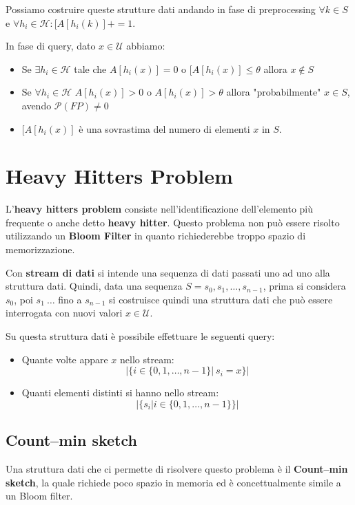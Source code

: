 Possiamo costruire queste strutture dati andando in fase di preprocessing $\forall k \in S$ e $\forall h_i \in \mathcal{H}: [A[h_i(k)] += 1$.

In fase di query, dato $x \in \mathcal{U}$ abbiamo:
\begin{itemize}
    \item Se $\exists h_i \in \mathcal{H}$ tale che $A[h_i(x)] = 0$ o $[A[h_i(x)] \leq \theta$ allora $x \notin S$
    \item Se $\forall h_i \in \mathcal{H}$ $A[h_i(x)] > 0$ o $A[h_i(x)] > \theta$ allora "probabilmente" $x \in S$, avendo $\mathcal{P}(FP) \neq 0$
    \item $[A[h_i(x)]$ è una sovrastima del numero di elementi $x$ in $S$.
\end{itemize}
\section{Heavy Hitters Problem}
L'\textbf{heavy hitters problem} consiste nell'identificazione dell'elemento più frequente o anche detto \textbf{heavy hitter}. Questo problema non può essere risolto utilizzando un \textbf{Bloom Filter} in quanto richiederebbe troppo spazio di memorizzazione.
\begin{definizione}
    Con \textbf{stream di dati} si intende una sequenza di dati passati uno ad uno alla struttura dati. Quindi, data una sequenza $S = s_0,s_1, \dots ,s_{n-1}$, prima si considera $s_0$, poi $s_1 \ \dots$ fino a $s_{n-1}$ si costruisce quindi una struttura dati che può essere interrogata con nuovi valori $x \in \mathcal{U}$.
\end{definizione}

Su questa struttura dati è possibile effettuare le seguenti query:
\begin{itemize}
    \item Quante volte appare $x$ nello stream:
    \begin{equation}
        | \{ i \in \{0, 1, \dots, n - 1\}| \ s_i = x \}|
    \end{equation}
    \item Quanti elementi distinti si hanno nello stream:
    \begin{equation}
        |\{s_i | i \in \{0, 1, \dots, n - 1\}\}|
    \end{equation}
\end{itemize}
\subsection{Count–min sketch}
Una struttura dati che ci permette di risolvere questo problema è il \textbf{Count–min sketch}, la quale richiede poco spazio in memoria ed è concettualmente simile a un Bloom filter.

